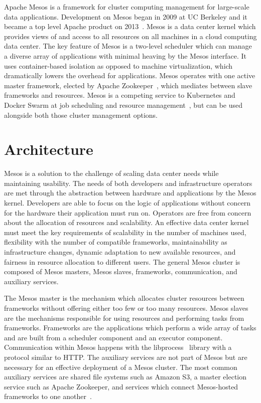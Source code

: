 Apache Mesos is a framework for cluster computing management for large-scale data applications. Development on Mesos began in 2009 at UC Berkeley and it became a top level Apache product on 2013~\cite{hid-sp18-404-Kakadia2015}. Mesos is a data center kernel which provides views of and access to all resources on all machines in a cloud computing data center. The key feature of Mesos is a two-level scheduler which can manage a diverse array of applications with minimal heaving by the Mesos interface. It uses container-based isolation as opposed to machine virtualization, which dramatically lowers the overhead for applications. Mesos operates with one active master framework, elected by Apache Zookeeper~\cite{hid-sp18-404-Winder15}, which mediates between slave frameworks and resources. Mesos is a competing service to Kubernetes and Docker Swarm at job scheduling and resource management~\cite{hid-sp18-404-Ivanovic2016}, but can be used alongside both those cluster management options. 

\section{Architecture}

Mesos is a solution to the challenge of scaling data center needs while maintaining usability. The needs of both developers and infrastructure operators are met through the abstraction between hardware and applications by the Mesos kernel. Developers are able to focus on the logic of applications without concern for the hardware their application must run on. Operators are free from concern about the allocation of resources and scalability. An effective data center kernel must meet the key requirements of scalability in the number of machines used, flexibility with the number of compatible frameworks, maintainability as infrastructure changes, dynamic adaptation to new available resources, and fairness in resource allocation to different users. The general Mesos cluster is composed of Mesos masters, Mesos slaves, frameworks, communication, and auxiliary services.

The Mesos master is the mechanism which allocates cluster resources between frameworks without offering either too few or too many resources. 
Mesos slaves are the mechanisms responsible for using resources and performing tasks from frameworks. Frameworks are the applications which perform a wide array of tasks and are built from a scheduler component and an executor component. Communication within Mesos happens with the libprocess~\cite{hid-sp18-404-Kakadia2015} library with a protocol similar to HTTP. The auxiliary services are not part of Mesos but are necessary for an effective deployment of a Mesos cluster. The most common auxiliary services are shared file systems such as Amazon S3, a master election service such as Apache Zookeeper, and services which connect Mesos-hosted frameworks to one another~\cite{hid-sp18-404-Denman2017}.

